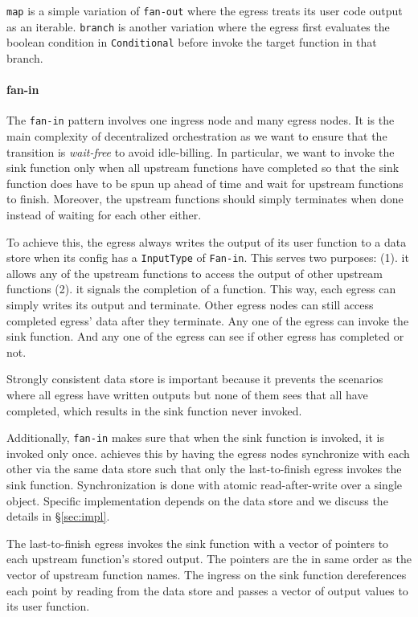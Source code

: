 \texttt{map} is a simple variation of \texttt{fan-out} where the egress treats
its user code output as an iterable. \texttt{branch} is another variation
where the egress first evaluates the boolean condition in \texttt{Conditional}
before invoke the target function in that branch.

\paragraph{fan-in}

The \texttt{fan-in} pattern involves one ingress node and many egress nodes.
It is the main complexity of decentralized orchestration as we want to ensure
that the transition is \emph{wait-free} to avoid idle-billing. In particular,
we want to invoke the sink function only when all upstream functions have
completed so that the sink function does have to be spun up ahead of time and
wait for upstream functions to finish. Moreover, the upstream functions should
simply terminates when done instead of waiting for each other either.

To achieve this, the \deorc{} egress always writes the output of its user
function to a data store when its \name{} config has a \texttt{InputType} of
\texttt{Fan-in}. This serves two purposes: (1). it allows any of the upstream
functions to access the output of other upstream functions (2). it signals the
completion of a function. This way, each egress can simply writes its output
and terminate. Other egress nodes can still access completed egress' data
after they terminate. Any one of the egress can invoke the sink function. And
any one of the egress can see if other egress has completed or not.

Strongly consistent data store is important because it prevents the
scenarios where all egress have written outputs but none of them sees that all
have completed, which results in the sink function never invoked.

Additionally, \texttt{fan-in} makes sure that when the sink function is
invoked, it is invoked only once. \name{} achieves this by having the egress
nodes synchronize with each other via the same data store such that only the
last-to-finish egress invokes the sink function. Synchronization is done with
atomic read-after-write over a single object. Specific implementation depends
on the data store and we discuss the details in \S\ref{sec:impl}.

The last-to-finish egress invokes the sink function with a vector of pointers
to each upstream function's stored output. The pointers are the in same order
as the vector of upstream function names. The ingress on the sink function
dereferences each point by reading from the data store and passes a vector of
output values to its user function.


